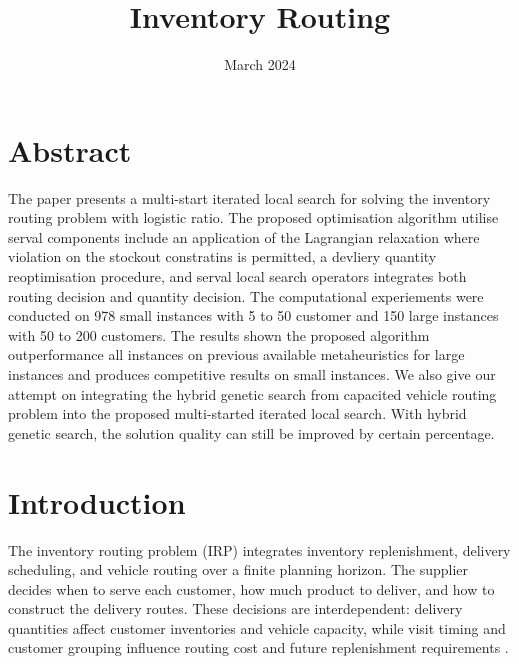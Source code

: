 \documentclass{article}
\title{Inventory Routing}
\date{March 2024}
\begin{document}
\maketitle

\section{Abstract}

The paper presents a multi-start iterated local search  for solving the inventory routing problem with logistic ratio. The proposed optimisation algorithm utilise serval components include an application of the Lagrangian relaxation where violation on the stockout constratins is permitted, a devliery quantity reoptimisation procedure, and serval local search operators integrates both routing decision and quantity decision. The computational experiements were conducted on 978 small instances with 5 to 50 customer and 150 large instances with 50 to 200 customers. The results shown the proposed algorithm outperformance all instances on previous available metaheuristics for large instances and produces competitive results on small instances. We also give our attempt on integrating the hybrid genetic search from capacited vehicle routing problem into the proposed multi-started iterated local search. With hybrid genetic search, the solution quality can still be improved by certain percentage.

\section{Introduction}
\label{sec:introduction}

The inventory routing problem (IRP) integrates inventory replenishment,
delivery scheduling, and vehicle routing over a finite planning horizon.
The supplier decides when to serve each customer, how much product to
deliver, and how to construct the delivery routes. These decisions are
interdependent: delivery quantities affect customer inventories and vehicle
capacity, while visit timing and customer grouping influence routing cost
and future replenishment requirements
\citep{bertazzi2012inventory,coelho2014thirty}.
\end{document}
